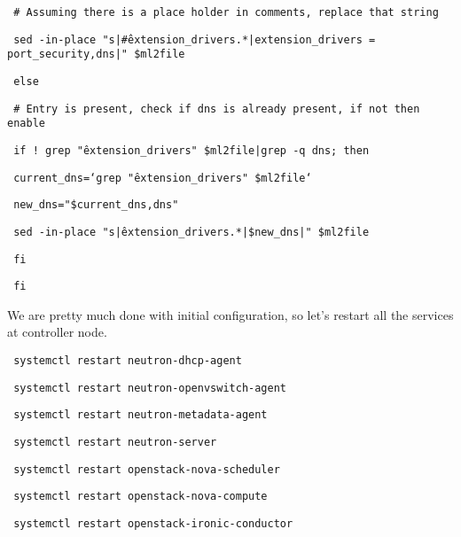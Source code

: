 \documentclass[12pt]{article}
\begin{document}
\begin{bash}\texttt{\small{     \# Assuming there is a place holder in comments, replace that string}}\end{bash}
\begin{bash}\texttt{\small{     sed -in-place  "s|\^\#extension\_drivers.*|extension\_drivers = port\_security,dns|" \$ml2file}}\end{bash}
\begin{bash}\texttt{\small{ else}}\end{bash}
\begin{bash}\texttt{\small{     \# Entry is present, check if dns is already present, if not then enable}}\end{bash}
\begin{bash}\texttt{\small{     if ! grep "\^extension\_drivers" \$ml2file|grep -q dns; then}}\end{bash}
\begin{bash}\texttt{\small{         current\_dns=`grep "\^extension\_drivers" \$ml2file`}}\end{bash}
\begin{bash}\texttt{\small{         new\_dns="\$current\_dns,dns"}}\end{bash}
\begin{bash}\texttt{\small{         sed -in-place  "s|\^extension\_drivers.*|\$new\_dns|" \$ml2file}}\end{bash}
\begin{bash}\texttt{\small{     fi}}\end{bash}
\begin{bash}\texttt{\small{ fi}}\end{bash}

We are pretty much done with initial configuration, so let’s restart all the services at controller node.

\begin{bash}\texttt{\small{ systemctl restart neutron-dhcp-agent}}\end{bash}
\begin{bash}\texttt{\small{ systemctl restart neutron-openvswitch-agent}}\end{bash}
\begin{bash}\texttt{\small{ systemctl restart neutron-metadata-agent}}\end{bash}
\begin{bash}\texttt{\small{ systemctl restart neutron-server}}\end{bash}
\begin{bash}\texttt{\small{ systemctl restart openstack-nova-scheduler}}\end{bash}
\begin{bash}\texttt{\small{ systemctl restart openstack-nova-compute}}\end{bash}
\begin{bash}\texttt{\small{ systemctl restart openstack-ironic-conductor}}\end{bash}
\end{document}

